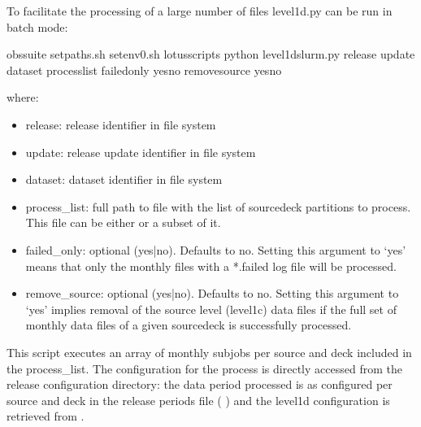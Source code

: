 \documentclass[letterpaper,10pt,english]{sphinxmanual}
\begin{document}
To facilitate the processing of a large number of files level1d.py can be run
in batch mode:

\begin{sphinxVerbatim}[commandchars=\\\{\}]
 obs\PYGZhy{}suite
 setpaths.sh
 setenv0.sh
 lotus\PYGZus{}scripts
python level1d\PYGZus{}slurm.py release update dataset  process\PYGZus{}list \PYGZhy{}\PYGZhy{}failed\PYGZus{}only yesno \PYGZhy{}\PYGZhy{}remove\PYGZus{}source yesno
\end{sphinxVerbatim}

where:
\begin{itemize}
\item {}
release: release identifier in file system

\item {}
update: release update identifier in file system

\item {}
dataset: dataset identifier in file system

\item {}
process\_list: full path to file with the list of source\sphinxhyphen{}deck partitions to
process. This file can be either {\hyperref[\detokenize{index:process-list-file}]{}} or a subset of it.

\item {}
failed\_only: optional (yes|no). Defaults to no. Setting this argument to ‘yes’
means that only the monthly files with a *.failed log file will be processed.

\item {}
remove\_source: optional (yes|no). Defaults to no. Setting this argument to ‘yes’
implies removal of the source level (level1c) data files if the full set of
monthly data files of a given source\sphinxhyphen{}deck is successfully processed.

\end{itemize}

This script executes an array of monthly subjobs per source and deck included in
the process\_list. The configuration for the process is directly accessed from
the release configuration directory: the data period processed is as configured
per source and deck in the release periods file ( {\hyperref[\detokenize{index:release-periods-file}]{}})
and the level1d configuration is retrieved from {\hyperref[\detokenize{index:level1d-config-file}]{}}.
\end{document}
